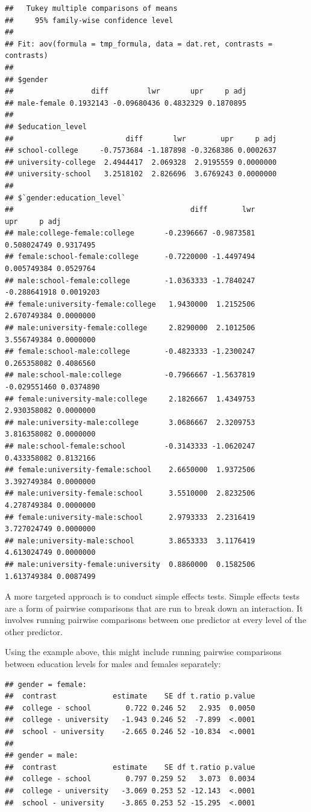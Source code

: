 \documentclass[
]{book}
\begin{document}
\begin{verbatim}
##   Tukey multiple comparisons of means
##     95% family-wise confidence level
## 
## Fit: aov(formula = tmp_formula, data = dat.ret, contrasts = contrasts)
## 
## $gender
##                  diff         lwr       upr     p adj
## male-female 0.1932143 -0.09680436 0.4832329 0.1870895
## 
## $education_level
##                          diff       lwr        upr     p adj
## school-college     -0.7573684 -1.187898 -0.3268386 0.0002637
## university-college  2.4944417  2.069328  2.9195559 0.0000000
## university-school   3.2518102  2.826696  3.6769243 0.0000000
## 
## $`gender:education_level`
##                                         diff        lwr          upr     p adj
## male:college-female:college       -0.2396667 -0.9873581  0.508024749 0.9317495
## female:school-female:college      -0.7220000 -1.4497494  0.005749384 0.0529764
## male:school-female:college        -1.0363333 -1.7840247 -0.288641918 0.0019203
## female:university-female:college   1.9430000  1.2152506  2.670749384 0.0000000
## male:university-female:college     2.8290000  2.1012506  3.556749384 0.0000000
## female:school-male:college        -0.4823333 -1.2300247  0.265358082 0.4086560
## male:school-male:college          -0.7966667 -1.5637819 -0.029551460 0.0374890
## female:university-male:college     2.1826667  1.4349753  2.930358082 0.0000000
## male:university-male:college       3.0686667  2.3209753  3.816358082 0.0000000
## male:school-female:school         -0.3143333 -1.0620247  0.433358082 0.8132166
## female:university-female:school    2.6650000  1.9372506  3.392749384 0.0000000
## male:university-female:school      3.5510000  2.8232506  4.278749384 0.0000000
## female:university-male:school      2.9793333  2.2316419  3.727024749 0.0000000
## male:university-male:school        3.8653333  3.1176419  4.613024749 0.0000000
## male:university-female:university  0.8860000  0.1582506  1.613749384 0.0087499
\end{verbatim}

A more targeted approach is to conduct simple effects tests. Simple effects tests are a form of pairwise comparisons that are run to break down an interaction. It involves running pairwise comparisons between one predictor at every level of the other predictor.

Using the example above, this might include running pairwise comparisons between education levels for males and females separately:

\begin{verbatim}
## gender = female:
##  contrast             estimate    SE df t.ratio p.value
##  college - school        0.722 0.246 52   2.935  0.0050
##  college - university   -1.943 0.246 52  -7.899  <.0001
##  school - university    -2.665 0.246 52 -10.834  <.0001
## 
## gender = male:
##  contrast             estimate    SE df t.ratio p.value
##  college - school        0.797 0.259 52   3.073  0.0034
##  college - university   -3.069 0.253 52 -12.143  <.0001
##  school - university    -3.865 0.253 52 -15.295  <.0001
\end{verbatim}
\end{document}
